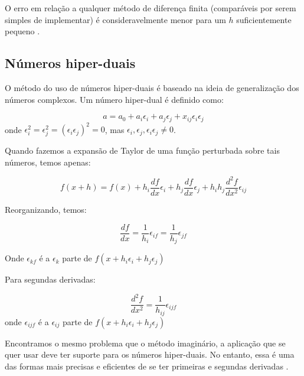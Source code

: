 O erro em relação a qualquer método de diferença finita (comparáveis por serem simples de implementar)
é consideravelmente menor para um \(h\) suficientemente pequeno \cite{caplan2011numerical}.

\subsection{Números hiper-duais}
\label{sec_hiper_dual}
O método do uso de números hiper-duais \cite{Fike_2011} é baseado na ideia de generalização dos números complexos.
Um número hiper-dual é definido como:

\begin{equation}
a = a_0 + a_i\epsilon_i + a_j\epsilon_j + x_{ij}\epsilon_i \epsilon_j
\end{equation}
onde \(\epsilon_i^2 = \epsilon_j^2 = (\epsilon_i\epsilon_j)^2 = 0\), mas \( \epsilon_i, \epsilon_j, \epsilon_i\epsilon_j  \neq 0\).

Quando fazemos a expansão de Taylor de uma função perturbada sobre tais números, temos apenas:

\begin{equation}
f(x+ h) = f(x) + h_i \frac{df}{dx} \epsilon_i + h_j \frac{df}{dx} \epsilon_j +    h_ih_j \frac{d^2f}{dx^2} \epsilon_{ij}
\end{equation}

Reorganizando, temos:

\begin{equation}
  \frac{df}{dx} = \frac{1}{h_i} \epsilon_{if} = \frac{1}{h_j} \epsilon_{jf}
\end{equation}


Onde \(\epsilon_{kf}\) é a \(\epsilon_k\) parte de \( f(x + h_i\epsilon_i + h_j\epsilon_j) \)

Para segundas derivadas:

\begin{equation}
\frac{d^2f}{dx^2} = \frac{1}{h_{ij}} \epsilon_{ijf}
\end{equation}
onde \(\epsilon_{ijf}\) é a \(\epsilon_{ij}\) parte de \( f(x + h_i\epsilon_i + h_j\epsilon_j) \)

Encontramos o mesmo problema que o método imaginário, a aplicação que se quer usar deve ter
suporte para os números hiper-duais. No entanto, essa é uma das formas mais precisas e
eficientes de se ter primeiras e segundas derivadas \cite{Fike_2011}.